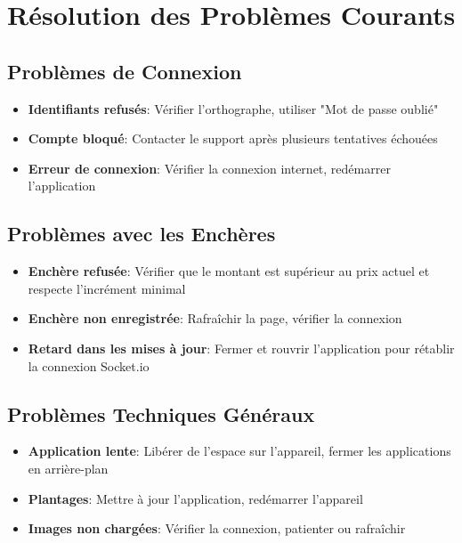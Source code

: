 \section{Résolution des Problèmes Courants}

\subsection{Problèmes de Connexion}

\begin{itemize}
    \item \textbf{Identifiants refusés}: Vérifier l'orthographe, utiliser "Mot de passe oublié"
    \item \textbf{Compte bloqué}: Contacter le support après plusieurs tentatives échouées
    \item \textbf{Erreur de connexion}: Vérifier la connexion internet, redémarrer l'application
\end{itemize}

\subsection{Problèmes avec les Enchères}

\begin{itemize}
    \item \textbf{Enchère refusée}: Vérifier que le montant est supérieur au prix actuel et respecte l'incrément minimal
    \item \textbf{Enchère non enregistrée}: Rafraîchir la page, vérifier la connexion
    \item \textbf{Retard dans les mises à jour}: Fermer et rouvrir l'application pour rétablir la connexion Socket.io
\end{itemize}

\subsection{Problèmes Techniques Généraux}

\begin{itemize}
    \item \textbf{Application lente}: Libérer de l'espace sur l'appareil, fermer les applications en arrière-plan
    \item \textbf{Plantages}: Mettre à jour l'application, redémarrer l'appareil
    \item \textbf{Images non chargées}: Vérifier la connexion, patienter ou rafraîchir
\end{itemize}

